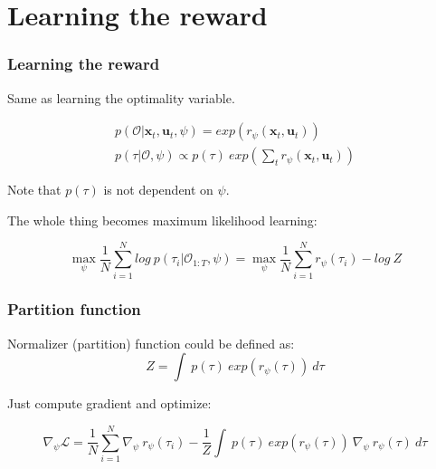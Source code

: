 \section{Learning the reward}

\begin{frame}
    \frametitle{Learning the reward}

    Same as learning the optimality variable.

    \begin{align}
        p(\mathcal{O} | \mathbf{x}_t, \mathbf{u}_t, \psi) = exp(r_{\psi}(\mathbf{x}_t, \mathbf{u}_t)) \\
        p(\tau | \mathcal{O}, \psi) \propto p(\tau)\ exp(\sum_t r_{\psi}(\mathbf{x}_t, \mathbf{u}_t))
    \end{align}

    Note that $p(\tau)$ is not dependent on $\psi$.

    The whole thing becomes maximum likelihood learning:

    \begin{equation}
        \max_{\psi} \frac{1}{N} \sum_{i=1}^{N} log\ p(\tau_i | \mathcal{O}_{1:T}, \psi) = \max_{\psi} \frac{1}{N} \sum_{i=1}^{N} r_\psi (\tau_i) - log\ Z
    \end{equation}

\end{frame}

\begin{frame}
    \frametitle{Partition function}

    Normalizer (partition) function could be defined as:
    \begin{equation}
        Z = \int\ p(\tau)\ exp(r_\psi(\tau))\ d\tau
    \end{equation}

    Just compute gradient and optimize:

    \begin{equation}
        \nabla_\psi \mathcal{L} = \frac{1}{N} \sum_{i=1}^{N} \nabla_\psi\ r_\psi(\tau_i) - \frac{1}{Z} \int\ p(\tau)\ exp(r_\psi(\tau))\ \nabla_\psi\ r_\psi(\tau)\ d\tau
    \end{equation}

\end{frame}

